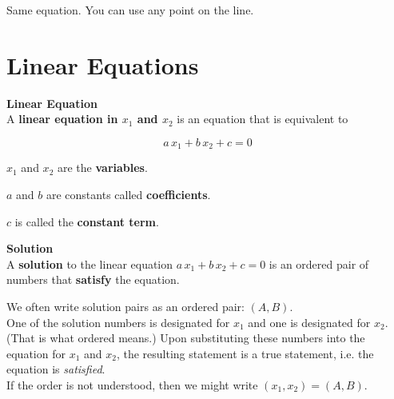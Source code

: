 \documentclass{ximera}
\begin{document}
Same equation.  You can use any point on the line.















\section{Linear Equations}


\begin{definition} \textbf{\textcolor{green!50!black}{Linear Equation}} \\


A \textbf{linear equation in $x_1$ and $x_2$} is an equation that is equivalent to 

\[
a \, x_1 + b \, x_2 + c = 0
\]


$x_1$ and $x_2$ are the \textbf{variables}.

$a$ and $b$ are constants called \textbf{coefficients}.

$c$ is called the \textbf{constant term}.

\end{definition}










\begin{definition} \textbf{\textcolor{green!50!black}{Solution}} \\


A \textbf{solution} to the linear equation  $a \, x_1 + b \, x_2 + c = 0$ is an ordered pair of numbers that \textbf{satisfy} the equation.


\end{definition}

\begin{notation}


We often write solution pairs as an ordered pair: $(A, B)$. \\


One of the solution numbers is designated for $x_1$ and one is designated for $x_2$.  (That is what ordered means.) Upon substituting these numbers into the equation for $x_1$ and $x_2$, the resulting statement is a true statement, i.e. the equation is \textit{satisfied}. \\

If the order is not understood, then we might write $(x_1, x_2) = (A, B)$.


\end{notation}
\end{document}
